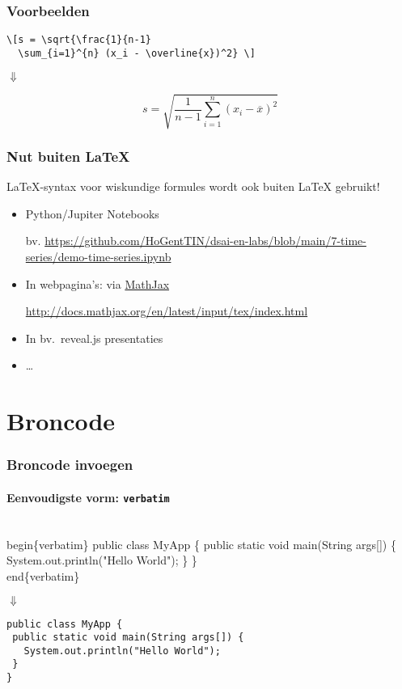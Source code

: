 \documentclass[aspectratio=169]{beamer}
\begin{document}
\begin{frame}[fragile]
  \frametitle{Voorbeelden}

\begin{verbatim}
\[s = \sqrt{\frac{1}{n-1} 
  \sum_{i=1}^{n} (x_i - \overline{x})^2} \]
\end{verbatim}

  \bigskip

  \centering
  $\Downarrow$

  \bigskip

  \[s = \sqrt{\frac{1}{n-1} \sum_{i=1}^{n} (x_i - \overline{x})^2} \]

\end{frame}

\begin{frame}
  \frametitle{Nut buiten {\LaTeX}}

  {\LaTeX}-syntax voor wiskundige formules wordt ook buiten {\LaTeX} gebruikt!

  \begin{itemize}
    \item Python/Jupiter Notebooks
    
    bv. \url{https://github.com/HoGentTIN/dsai-en-labs/blob/main/7-time-series/demo-time-series.ipynb}

    \item In webpagina's: via \href{https://www.mathjax.org}{MathJax}

    \url{http://docs.mathjax.org/en/latest/input/tex/index.html}

    \item In bv.~reveal.js presentaties
    \item \ldots
  \end{itemize}

\end{frame}

\section{Broncode}

\begin{frame}[fragile]
 \frametitle{Broncode invoegen}
 \framesubtitle{Eenvoudigste vorm: \texttt{verbatim}}

\begin{semiverbatim}
\alert{\\begin\{verbatim\}}
public class MyApp \{
 public static void main(String args[]) \{
   System.out.println("Hello World");
 \}
\}
\alert{\\end\{verbatim\}}
\end{semiverbatim}

  \centering
  $\Downarrow$

\begin{verbatim}
public class MyApp {
 public static void main(String args[]) {
   System.out.println("Hello World");
 }
}
\end{verbatim}

\end{frame}
\end{document}
